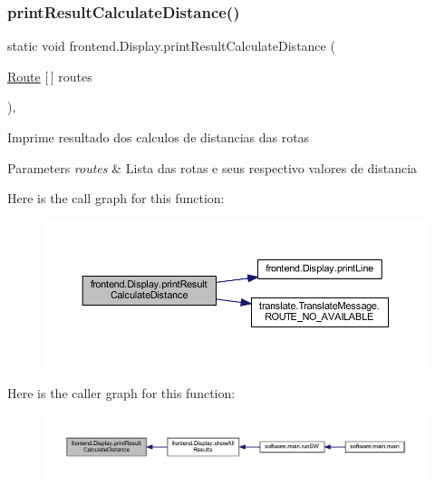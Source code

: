 \subsubsection{\texorpdfstring{print\+Result\+Calculate\+Distance()}{printResultCalculateDistance()}}
{\footnotesize\ttfamily static void frontend.\+Display.\+print\+Result\+Calculate\+Distance (\begin{DoxyParamCaption}\item[{\hyperlink{classdomain_1_1_route}{Route} \mbox{[}$\,$\mbox{]}}]{routes }\end{DoxyParamCaption})\hspace{0.3cm}{\ttfamily [static]}, {\ttfamily [private]}}

Imprime resultado dos calculos de distancias das rotas


\begin{DoxyParams}{Parameters}
{\em routes} & Lista das rotas e seus respectivo valores de distancia \\
\hline
\end{DoxyParams}
Here is the call graph for this function\+:\nopagebreak
\begin{figure}[H]
\begin{center}
\leavevmode
\includegraphics[width=350pt]{classfrontend_1_1_display_a891f43b99b7c9ff439b8eb0544774f48_cgraph}
\end{center}
\end{figure}
Here is the caller graph for this function\+:\nopagebreak
\begin{figure}[H]
\begin{center}
\leavevmode
\includegraphics[width=350pt]{classfrontend_1_1_display_a891f43b99b7c9ff439b8eb0544774f48_icgraph}
\end{center}
\end{figure}
\mbox{\label{classfrontend_1_1_display_a7480b033057115a5237b26915b52bbf4}} 
